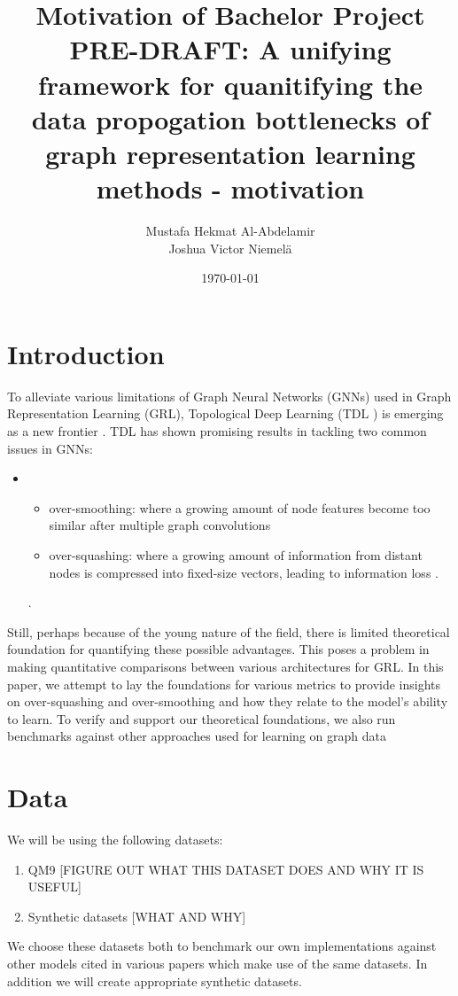 \documentclass[a4paper,12pt]{article}
\title{Motivation of Bachelor Project PRE-DRAFT: A unifying framework for quanitifying the data propogation bottlenecks of graph representation learning methods - motivation}
\author{
\color{red}  Mustafa Hekmat Al-Abdelamir\\
\color{red}  Joshua Victor Niemelä\\
}
\date{\today}
\begin{document}
\maketitle



\section{Introduction}
To alleviate various limitations of Graph Neural Networks (GNNs) used in Graph Representation Learning (GRL), Topological Deep Learning \cite{papamarkou_position:_2024} (TDL
) is emerging as a new frontier \cite{papamarkou_position:_2024}. 
TDL has shown promising results in tackling two common issues in GNNs: 
\begin{itemize}
    \item 
\begin{itemize}
    \item over-smoothing: where a growing amount of node features become too similar after multiple graph convolutions \cite{li_deeper_2018}
    \item over-squashing: where a growing amount of information from distant nodes is compressed into fixed-size vectors, leading to information loss \cite{alon_bottleneck_2021}.
\end{itemize}

 \cite{alon_bottleneck_2021}.
\end{itemize}

Still, perhaps because of the young nature of the field, there is limited theoretical foundation for quantifying these possible advantages. This poses a problem in making quantitative comparisons between various architectures for GRL. In this paper, we attempt to lay the foundations for various metrics to provide insights on over-squashing and over-smoothing and how they relate to the model's ability to learn. To verify and support our theoretical foundations, we also run benchmarks against other approaches used for learning on graph data \cite{horn_topological_2022}

\section{Data}
We will be using the following datasets:
\begin{enumerate}
    \item QM9 [FIGURE OUT WHAT THIS DATASET DOES AND WHY IT IS USEFUL]
    \item Synthetic datasets [WHAT AND WHY]
\end{enumerate}
We choose these datasets both to benchmark our own implementations against other models cited in various papers which make use of the same datasets. In addition we will create appropriate synthetic datasets.
\end{document}
